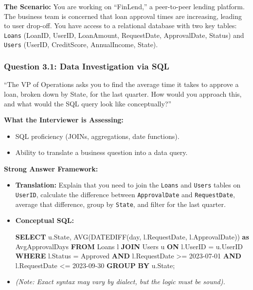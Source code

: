 \documentclass[
  11pt,
  openany,
  oneside]{book}
\newenvironment{Shaded}{}{}
\newcommand{\DataTypeTok}[1]{\textcolor[rgb]{0.56,0.13,0.00}{#1}}
\newcommand{\FunctionTok}[1]{\textcolor[rgb]{0.02,0.16,0.49}{#1}}
\newcommand{\KeywordTok}[1]{\textcolor[rgb]{0.00,0.44,0.13}{\textbf{#1}}}
\newcommand{\NormalTok}[1]{#1}
\newcommand{\OperatorTok}[1]{\textcolor[rgb]{0.40,0.40,0.40}{#1}}
\newcommand{\StringTok}[1]{\textcolor[rgb]{0.25,0.44,0.63}{#1}}
\providecommand{\tightlist}{%
  \setlength{\itemsep}{0pt}\setlength{\parskip}{0pt}}
\begin{document}
\textbf{The Scenario:} You are working on ``FinLend,'' a peer-to-peer
lending platform. The business team is concerned that loan approval
times are increasing, leading to user drop-off. You have access to a
relational database with two key tables: \texttt{Loans} (LoanID, UserID,
LoanAmount, RequestDate, ApprovalDate, Status) and \texttt{Users}
(UserID, CreditScore, AnnualIncome, State).

\subsubsection{Question 3.1: Data Investigation via
SQL}\label{question-3.1-data-investigation-via-sql}

``The VP of Operations asks you to find the average time it takes to
approve a loan, broken down by State, for the last quarter. How would
you approach this, and what would the SQL query look like
conceptually?''

\textbf{What the Interviewer is Assessing:}

\begin{itemize}
\tightlist
\item
  SQL proficiency (JOINs, aggregations, date functions).
\item
  Ability to translate a business question into a data query.
\end{itemize}

\textbf{Strong Answer Framework:}

\begin{itemize}
\item
  \textbf{Translation:} Explain that you need to join the \texttt{Loans}
  and \texttt{Users} tables on \texttt{UserID}, calculate the difference
  between \texttt{ApprovalDate} and \texttt{RequestDate}, average that
  difference, group by \texttt{State}, and filter for the last quarter.
\item
  \textbf{Conceptual SQL:}

\begin{Shaded}
\begin{Highlighting}[]
\KeywordTok{SELECT}\NormalTok{ u.State, }\FunctionTok{AVG}\NormalTok{(DATEDIFF(}\DataTypeTok{day}\NormalTok{, l.RequestDate, l.ApprovalDate)) }\KeywordTok{as}\NormalTok{ AvgApprovalDays}
\KeywordTok{FROM}\NormalTok{ Loans l}
\KeywordTok{JOIN}\NormalTok{ Users u }\KeywordTok{ON}\NormalTok{ l.UserID }\OperatorTok{=}\NormalTok{ u.UserID}
\KeywordTok{WHERE}\NormalTok{ l.Status }\OperatorTok{=} \StringTok{\textquotesingle{}Approved\textquotesingle{}} 
  \KeywordTok{AND}\NormalTok{ l.RequestDate }\OperatorTok{\textgreater{}=} \StringTok{\textquotesingle{}2023{-}07{-}01\textquotesingle{}} \KeywordTok{AND}\NormalTok{ l.RequestDate }\OperatorTok{\textless{}=} \StringTok{\textquotesingle{}2023{-}09{-}30\textquotesingle{}}
\KeywordTok{GROUP} \KeywordTok{BY}\NormalTok{ u.State;}
\end{Highlighting}
\end{Shaded}
\item
  \emph{(Note: Exact syntax may vary by dialect, but the logic must be
  sound).}
\end{itemize}
\end{document}
